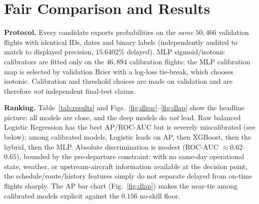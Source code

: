 \documentclass[conference]{IEEEtran}
\begin{document}
\section{Fair Comparison and Results}
\label{sec:eval}
\textbf{Protocol.}
Every candidate exports probabilities on the \emph{same} $50{,}466$ validation
flights with identical IDs, dates and binary labels (independently audited to
match to displayed precision, $15.6402\%$ delayed). MLP sigmoid/isotonic
calibrators are fitted only on the $46{,}894$ calibration flights; the MLP
calibration map is selected by validation Brier with a log-loss tie-break, which
chooses isotonic. Calibration and threshold choices are made on validation and
are therefore \emph{not} independent final-test claims.

\begin{table}[!t]
  \caption{Validation metrics on the $50{,}466$ aligned flights (selected
  calibration). AP/ROC-AUC higher is better; Brier/log loss/ECE lower is better.}
  \label{tab:results}
  \centering
  \setlength{\tabcolsep}{3.5pt}
\end{table}

\textbf{Ranking.}
Table~\ref{tab:results} and Figs.~\ref{fig:dlroc}--\ref{fig:dlap} show the
headline picture: all models are close, and the deep models do \emph{not} lead.
Raw balanced Logistic Regression has the best AP/ROC-AUC but is severely
miscalibrated (see below); among calibrated models, Logistic leads on AP, then
XGBoost, then the hybrid, then the MLP. Absolute discrimination is modest
(ROC-AUC $\approx 0.62$--$0.65$), bounded by the pre-departure constraint: with no
same-day operational state, weather, or upstream-aircraft information available at
the decision point, the schedule/route/history features simply do not separate
delayed from on-time flights sharply. The AP bar chart (Fig.~\ref{fig:dlap})
makes the near-tie among calibrated models explicit against the $0.156$ no-skill
floor.
\end{document}
